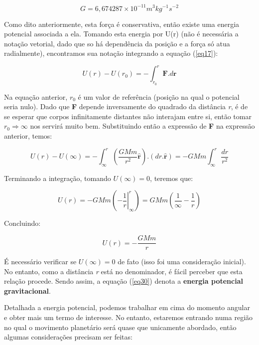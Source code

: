 \begin{equation}
    G =  6,674287 \times 10^{-11}  m^3kg^{-1}s^{-2}   \label{eq26}
\end{equation}

Como dito anteriormente, esta força é conservativa, então existe uma energia potencial associada a ela. Tomando esta energia por U(r) (não é necessária a notação vetorial, dado que so há dependência da posição e a força só atua radialmente), encontramos sua notação integrando a equação (\ref{eq17}):

\begin{equation}
    U(r) - U(r_0) = -\int_{r_0}^{r}{\mathbf{F}.d\mathbf{r}}
    \label{eq27}
\end{equation}

Na equação anterior, $r_0$ é um valor de referência (posição na qual o potencial seria nulo). Dado que \textbf{F} depende inversamente do quadrado da distância \textit{r}, é de se esperar que corpos infinitamente distantes não interajam entre si, então tomar $r_0 \Rightarrow \infty$ nos servirá muito bem. Substituindo então a expressão de \textbf{F} na expressão anterior, temos:

\begin{equation}
    U(r) - U(\infty) = -\int_{\infty}^{r}{\left(\frac{GMm}{r^2}\mathbf{\hat{r}}\right).\left(dr.\mathbf{\hat{r}}\right)} =  -GMm\int_{\infty}^{r}{\frac{dr}{r^2}}
    \label{eq28}
\end{equation}

Terminando a integração, tomando $U(\infty) = 0$, teremos que:

\begin{equation}
    U(r) = -GMm\left(-\left.\frac{1}{r}\right|_{\infty}^r \right) = GMm \left( \frac{1}{\infty} - \frac{1}{r} \right)
    \label{eq29}
\end{equation}

Concluindo:

\begin{equation}
    U(r) = -\frac{GMm}{r} \label{eq30}
\end{equation}

É necessário verificar se $U(\infty) = 0$ de fato (isso foi uma consideração inicial). No entanto, como a distância \textit{r} está no denominador, é fácil perceber que esta relação procede. Sendo assim, a equação (\ref{eq30}) denota a \textbf{energia potencial gravitacional}.{\\}

Detalhada a energia potencial, podemos trabalhar em cima do momento angular e obter mais um termo de interesse. No entanto, estaremos entrando numa região no qual o movimento planetário será quase que unicamente abordado, então algumas considerações precisam ser feitas:

